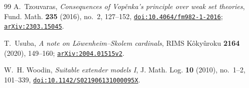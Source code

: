 \documentclass[11pt,a4paper]{amsart}
\theoremstyle{plain}
\theoremstyle{definition}
\theoremstyle{remark}
\begin{document}
\begin{thebibliography}{99}
A.~Tzouvaras,
\emph{Consequences of Vop\v{e}nka's principle over weak set theories},
Fund. Math. \textbf{235} (2016), no.~2, 127--152,
\href{https://doi.org/10.4064/fm982-1-2016}{\nolinkurl{doi:10.4064/fm982-1-2016}};
\href{https://arxiv.org/abs/2303.15045}{\nolinkurl{arXiv:2303.15045}}.

T.~Usuba,
\emph{A note on L\"owenheim--Skolem cardinals},
RIMS K\^oky\^uroku \textbf{2164} (2020), 149--160;
\href{https://arxiv.org/abs/2004.01515}{\nolinkurl{arXiv:2004.01515v2}}.

W.~H. Woodin,
\emph{Suitable extender models I},
J. Math. Log. \textbf{10} (2010), no.~1--2, 101--339,
\href{https://doi.org/10.1142/S021906131000095X}{\nolinkurl{doi:10.1142/S021906131000095X}}.

\end{thebibliography}
\end{document}
